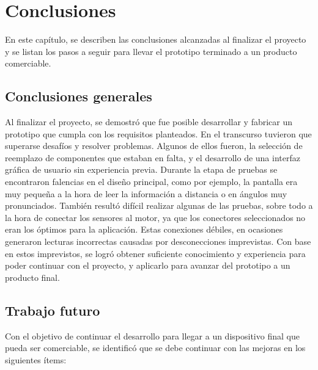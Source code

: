 \chapter{Conclusiones}

\label{Chapter5}

En este capítulo, se describen las conclusiones alcanzadas al finalizar el proyecto y se listan los pasos a seguir para llevar el prototipo terminado a un producto comerciable.

\section{Conclusiones generales}

Al finalizar el proyecto, se demostró que fue posible desarrollar y fabricar un prototipo que cumpla con los requisitos planteados. En el transcurso tuvieron que superarse desafíos y resolver problemas. Algunos de ellos fueron, la selección de reemplazo de componentes que estaban en falta, y el desarrollo de una interfaz gráfica de usuario sin experiencia previa.  Durante la etapa de pruebas se encontraron falencias en el diseño principal, como por ejemplo, la pantalla era muy pequeña a la hora de leer la información a distancia o en ángulos muy pronunciados. También resultó difícil realizar algunas de las pruebas, sobre todo a la hora de conectar los sensores al motor, ya que los conectores seleccionados no eran los óptimos para la aplicación. Estas conexiones débiles, en ocasiones generaron lecturas incorrectas causadas por desconecciones imprevistas. Con base en estos imprevistos, se logró obtener suficiente conocimiento y experiencia para poder continuar con el proyecto, y aplicarlo para avanzar del prototipo a un producto final.

\section{Trabajo futuro}
Con el objetivo de continuar el desarrollo para llegar a un dispositivo final que pueda ser comerciable, se identificó que se debe continuar con las mejoras en los siguientes ítems:

